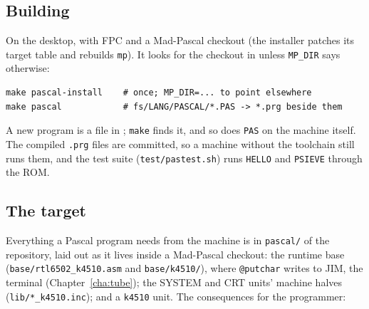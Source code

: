 \subsection*{Building}
On the desktop, with FPC and a Mad-Pascal checkout (the installer
patches its target table and rebuilds \texttt{mp}). It looks for the
checkout in  unless
\texttt{MP\_DIR} says otherwise:

\begin{verbatim}
make pascal-install    # once; MP_DIR=... to point elsewhere
make pascal            # fs/LANG/PASCAL/*.PAS -> *.prg beside them
\end{verbatim}

A new program is a file in ; \texttt{make} finds
it, and so does \verb|PAS| on the machine itself.
The compiled \texttt{.prg} files are committed, so a machine without
the toolchain still runs them, and the test suite (\texttt{test/pastest.sh})
runs \verb|HELLO| and \verb|PSIEVE| through the ROM.

\subsection*{The target}
Everything a Pascal program needs from the machine is in
\texttt{pascal/} of the repository, laid out as it lives inside a
Mad-Pascal checkout: the runtime base (\texttt{base/rtl6502\_k4510.asm}
and \texttt{base/k4510/}), where \texttt{@putchar} writes to JIM, the
terminal (Chapter~\ref{cha:tube}); the SYSTEM and CRT units' machine
halves (\texttt{lib/*\_k4510.inc}); and a \texttt{k4510} unit. The
consequences for the programmer:


